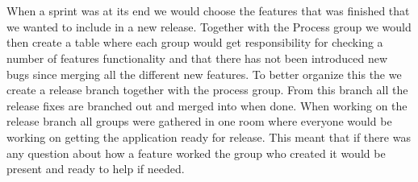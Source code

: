 \\
\\
When a sprint was at its end we would choose the features that was finished that we wanted to include in a new release.
Together with the Process group we would then create a table where each group would get responsibility for checking a number of features functionality and that there has not been introduced new bugs since merging all the different new features.
To better organize this the we create a release branch together with the process group.
From this branch all the release fixes are branched out and merged into when done.
When working on the release branch all groups were gathered in one room where everyone would be working on getting the application ready for release.
This meant that if there was any question about how a feature worked the group who created it would be present and ready to help if needed.